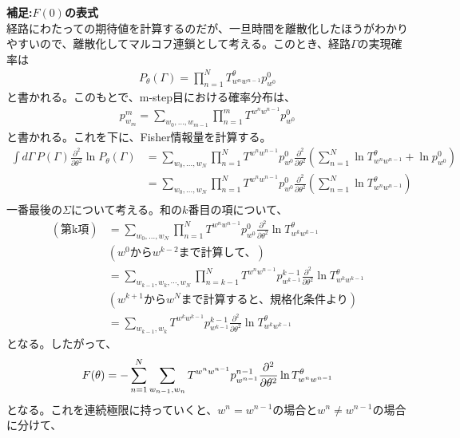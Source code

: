 \documentclass[a4paper,11pt]{jsarticle}
\numberwithin{equation}{section}
\begin{document}
\textbf{補足:$F(0)$の表式}\\
経路にわたっての期待値を計算するのだが、一旦時間を離散化したほうがわかりやすいので、離散化してマルコフ連鎖として考える。このとき、経路$\Gamma$の実現確率は
\begin{align}
    P_\theta(\Gamma) = \prod_{n=1}^N T^\theta_{w^n w^{n-1}} p^0_{w^0}
\end{align}
と書かれる。このもとで、m-step目における確率分布は、
\begin{align}
    p^m_{w_m} = \sum_{w_0, \dots, w_{m-1}} \prod_{n=1}^m T^{w^n w^{n-1}} p^0_{w^0}
\end{align}
と書かれる。これを下に、Fisher情報量を計算する。
\begin{align}
    \int d\Gamma \, P(\Gamma) \frac{\partial^2}{\partial \theta^2} \ln P_\theta(\Gamma) 
    &= \sum_{w_0, \dots, w_N} \prod_{n=1}^N T^{w^n w^{n-1}} p^0_{w^0} 
    \frac{\partial^2}{\partial \theta^2} 
    \left(
        \sum_{n=1}^N \ln T^\theta_{w^n w^{n-1}} + \ln p^0_{w^0}
    \right) \\
    &= \sum_{w_0, \dots, w_N} \prod_{n=1}^N T^{w^n w^{n-1}} p^0_{w^0} 
    \frac{\partial^2}{\partial \theta^2} 
    \left(
        \sum_{n=1}^N \ln T^\theta_{w^n w^{n-1}}
    \right) \\
\end{align}
一番最後の$\Sigma$について考える。和の$k$番目の項について、
\begin{align}
    (\text{第k項}) &= \sum_{w_0, \dots, w_N} \prod_{n=1}^N T^{w^n w^{n-1}} p^0_{w^0} \frac{\partial^2}{\partial \theta^2} \ln T^\theta_{w^k w^{k-1}} \\
    &(w^{0}\text{から}w^{k-2}\text{まで計算して、}) \nonumber \\
    &= \sum_{w_{k-1}, w_k,\cdots, w_N} \prod_{n=k-1}^N T^{w^n w^{n-1}} p^{k-1}_{w^{k-1}}\frac{\partial^2}{\partial \theta^2} \ln T^\theta_{w^k w^{k-1}} \\
    &(w^{k+1}\text{から}w^{N}\text{まで計算すると、規格化条件より}) \nonumber \\
    &= \sum_{w_{k-1}, w_k} T^{w^k w^{k-1}} p^{k-1}_{w^{k-1}}\frac{\partial^2}{\partial \theta^2} \ln T^\theta_{w^k w^{k-1}} 
\end{align}
となる。したがって、
\begin{align}
    F(\theta) = -\sum_{n=1}^N \sum_{w_{n-1}, w_n} T^{w^n w^{n-1}} p^{n-1}_{w^{n-1}} \pdv[2]{\theta} \ln T^\theta_{w^n w^{n-1}}
\end{align}
となる。これを連続極限に持っていくと、$w^n = w^{n-1}$の場合と$w^n \neq w^{n-1}$の場合に分けて、
\end{document}
